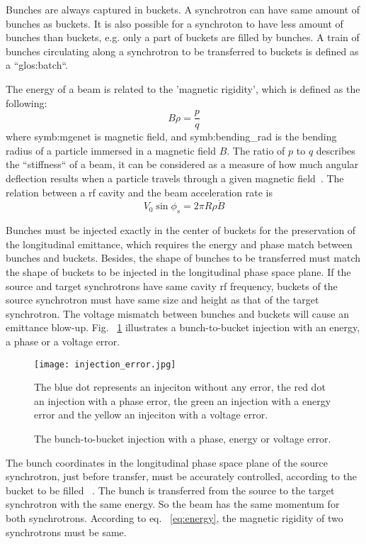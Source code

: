 Bunches are always captured in buckets. A synchrotron can have same amount of bunches as buckets. It is also possible for a synchroton to have less amount of bunches than buckets, e.g. only a part of buckets are filled by bunches. A train of bunches circulating along a synchrotron to be transferred to buckets is defined as a ``\gls{glos:batch}``.

The energy of a beam is related to the 'magnetic rigidity', which is defined as the following:
\begin{equation}
	\label{eq:energy}
	B\rho =\frac{p}{q}
\end{equation}
where \gls{symb:mgenet} is magnetic field, and \gls{symb:bending_rad} is the bending radius of a particle immersed in a magnetic field $B$. The ratio of $p$ to $q$ describes the ``stiffness`` of a beam, it can be considered as a measure of how much angular deflection results when a particle travels through a given magnetic field~\cite{barletta_overview_????}. The relation between a rf cavity and the beam acceleration rate is
\begin{equation}
	\label{eq:rf_acceleration}
	V_0\sin\phi_s=2\pi R\rho\dot{B}
\end{equation}

Bunches must be injected exactly in the center of buckets for the preservation of the longitudinal emittance, which requires the energy and phase match between bunches and buckets. Besides, the shape of bunches to be transferred must match the shape of buckets to be injected in the longitudinal phase space plane. If the source and target synchrotrons have same cavity rf frequency, buckets of the source synchrotron must have same size and height as that of the target synchrotron. The voltage mismatch between bunches and buckets will cause an emittance blow-up. Fig. ~\ref{injection_error} illustrates a bunch-to-bucket injection with an energy, a phase or a voltage error. 
\begin{figure}[!htb]
   \centering   
   \texttt{[image: injection\_error.jpg]}
   \caption{The bunch-to-bucket injection with a phase, energy or voltage error.}{The blue dot represents an injeciton without any error, the red dot an injection with a phase error, the green an injection with a energy error and the yellow an injeciton with a voltage error.}
   \label{injection_error}
\end{figure} 

The bunch coordinates in the longitudinal phase space plane of the source synchrotron, just before transfer, must be accurately controlled, according to the bucket to be filled ~\cite{garoby_timing_1984}. The bunch is transferred from the source to the target synchrotron with the same energy. So the beam has the same momentum for both synchrotrons. According to eq. ~\ref{eq:energy}, the magnetic rigidity of two synchrotrons must be same.

